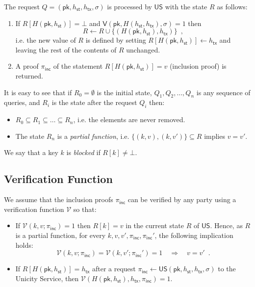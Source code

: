 \documentclass{article}
\newcommand{\sigver}[0]{\mathsf{V}}
\newcommand{\pubkey}[0]{\mathsf{pk}}
\newcommand{\unisrv}[0]{\mathsf{US}}
\newcommand{\sthash}[0]{h_\mathsf{st}}
\newcommand{\txhash}[0]{h_\mathsf{tx}}
\newcommand{\univer}[0]{\mathcal{V}}
\newcommand{\pinc}[0]{\pi_{\mathsf{inc}}}
\begin{document}
\noindent The request $Q=(\pubkey,\sthash,\txhash,\sigma)$ is processed by $\unisrv$ with the state $R$ as follows:
\begin{enumerate}
\item If $R[H(\pubkey, \sthash)] = \bot$ and $\sigver(\pubkey, H(\sthash, \txhash), \sigma) = 1$ then
\[
R \gets R \cup \{(H(\pubkey, \sthash), \txhash)\} \enspace,
\]
i.e. the new value of $R$ is defined by setting $R[H(\pubkey, \sthash)] \gets \txhash$ and leaving the rest of the contents of $R$ unchanged.
\item A proof $\pinc$ of the statement $R[H(\pubkey, \sthash)] = v$ (inclusion proof) is returned.
\end{enumerate}

\noindent It is easy to see that if $R_0 = \emptyset$ is the initial state, $Q_1, Q_2, \ldots, Q_n$ is any sequence of queries, and $R_i$ is the state after the request $Q_i$ then:
\begin{itemize}
\item $R_0 \subseteq R_1 \subseteq \ldots \subseteq R_n$, i.e. the elements are never removed.
\item The state $R_n$ is a \emph{partial function}, i.e.
$\{(k, v), (k, v')\} \subseteq R$ implies $v = v'$.
\end{itemize}

We say that a key $k$ is \emph{blocked} if $R[k] \neq \bot$.

\subsection{Verification Function}

We assume that the inclusion proofs $\pinc$ can be verified by any party using a verification function $\univer$ so that:
\begin{itemize}
\item If $\univer(k, v; \pinc) = 1$ then $R[k] = v$ in the current state $R$ of $\unisrv$. Hence, as $R$ is a partial function, for every $k, v, v', \pinc, \pinc'$, the following implication holds:
\begin{equation}\label{eq:eqtx}
\univer(k, v; \pinc) = \univer(k, v'; \pinc') = 1 \quad \Rightarrow \quad v =v' \enspace.
\end{equation}
\item If $R[H(\pubkey, \sthash)] = \txhash$ after a request $\pinc \gets \unisrv(\pubkey, \sthash, \txhash, \sigma)$ to the Unicity Service, then $\univer(H(\pubkey, \sthash), \txhash, \pinc) = 1$.
\end{itemize}
\end{document}
